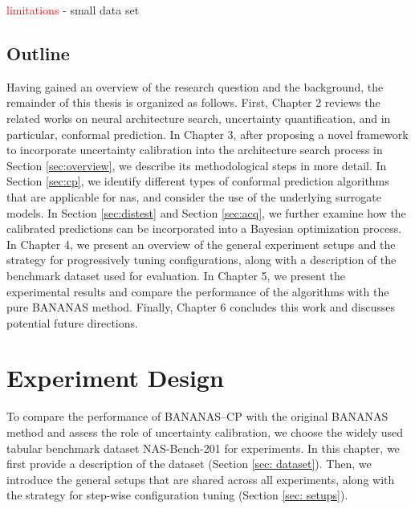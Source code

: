 \documentclass[a4paper,oneside,bibliography=totoc]{scrbook}
\begin{document}
\textcolor{red}{limitations}
- small data set


\section{Outline}
Having gained an overview of the research question and the background, the remainder of this thesis is organized as follows. First, Chapter 2 reviews the related works on neural architecture search, uncertainty quantification, and in particular, conformal prediction. In Chapter 3, after proposing a novel framework to incorporate uncertainty calibration into the architecture search process in Section \ref{sec:overview}, we describe its methodological steps in more detail. In Section \ref{sec:cp}, we identify different types of conformal prediction algorithms that are applicable for \gls{nas}, and consider the use of the underlying surrogate models. In Section \ref{sec:distest} and Section \ref{sec:acq}, we further examine how the calibrated predictions can be incorporated into a Bayesian optimization process. In Chapter 4, we present an overview of the general experiment setups and the strategy for progressively tuning configurations, along with a description of the benchmark dataset used for evaluation. In Chapter 5, we present the experimental results and compare the performance of the algorithms with the pure BANANAS method. Finally, Chapter 6 concludes this work and discusses potential future directions.  





\chapter{Experiment Design}
\label{ch4}
To compare the performance of BANANAS--CP with the original BANANAS method and assess the role of uncertainty calibration, we choose the widely used tabular benchmark dataset NAS-Bench-201 \cite{dong2020nasbench201} for experiments. In this chapter, we first provide a description of the dataset (Section \ref{sec: dataset}). Then, we introduce the general setups that are shared across all experiments, along with the strategy for step-wise configuration tuning  (Section \ref{sec: setups}).
\end{document}
